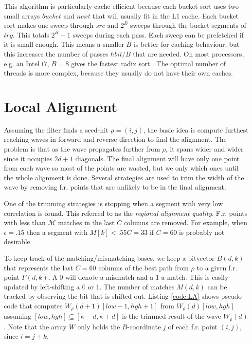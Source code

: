 \documentclass[../main/thesis.tex]{subfiles}
\begin{document}


This algorithm is particularly cache efficient because each bucket sort uses two small arrays $bucket$ and $next$ that will usually fit in the L1 cache.
Each bucket sort makes one sweep through $src$ and $2^B$ sweeps through the bucket segments of $trg$.
This totals $2^B+1$ sweeps during each pass.
Each sweep can be prefetched if it is small enough.
This means a smaller $B$ is better for caching behaviour, but this increases the number of passes $hbit/B$ that are needed.
On most processors, e.g. an Intel i7, $B = 8$ gives the fastest radix sort \cite{Daligner}.
The optimal number of threads is more complex, because they usually do not have their own caches.



\section{Local Alignment}
Assuming the filter finds a seed-hit $\rho = (i,j)$, the basic idea is compute furthest reaching waves in forward and reverse direction to find the alignment.
The problem is that as the wave propagates further from $\rho$, it spans wider and wider since it occupies $2d+1$ diagonals.
The final alignment will have only one point from each wave so most of the points are wasted, but we only which ones until the whole alignment is done.
Several strategies are used to trim the width of the wave by removing f.r. points that are unlikely to be in the final alignment.

One of the trimming strategies is stopping when a segment with very low correlation is found.
This referred to as the \textit{regional alignment quality}.
F.r. points with less than $\mathcal{M}$ matches in the last $C$ columns are removed.
For example, when $\epsilon = .15$ then a segment with $M[k] < .55C = 33$ if $C = 60$ is probably not desirable.

To keep track of the matching/mismatching bases, we keep a bitvector $B(d,k)$ that represents the last $C = 60$ columns of the best path from $\rho$ to a given f.r. point $F(d,k)$.
A 0 will denote a mismatch and a 1 a match.
This is easily updated by left-shifting a 0 or 1.
The number of matches $M(d,k)$ can be tracked by observing the bit that is shifted out.
Listing \ref{code:LA} shows pseudo-code that computes $W_\rho(d+1)[low-1,hgh+1]$ from $W_\rho(d)[low,hgh]$ assuming $[low,hgh] \subseteq [\kappa-d,\kappa+d]$ is the trimmed result of the wave $W_\rho(d)$.
Note that the array $W$ only holds the $B$-coordinate $j$ of each f.r. point $(i,j)$, since $i = j + k$.
\end{document}
